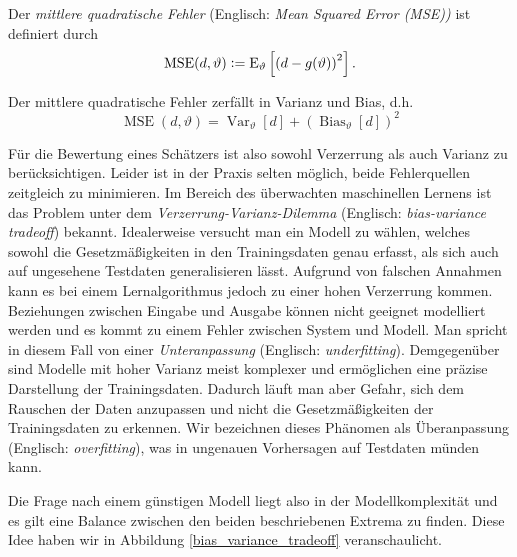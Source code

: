 \begin{defn}
Der \textit{mittlere quadratische Fehler} (Englisch: \textit{Mean Squared Error (MSE))} ist definiert durch
$$\operatorname {MSE} (d,\vartheta ) \vcentcolon= \operatorname{E} _{\vartheta}\left[\left(d-g(\vartheta )\right)^{2}\right].$$
\end{defn}

\begin{thm}
Der mittlere quadratische Fehler zerfällt in Varianz und Bias, d.h.
$$\operatorname{MSE} (d,\vartheta) = \operatorname{Var}_{\vartheta}[d]+\left(\operatorname{Bias}_{\vartheta}[d]\right)^{2}$$
\end{thm}

Für die Bewertung eines Schätzers ist also sowohl Verzerrung als auch Varianz zu berücksichtigen. Leider ist in der Praxis selten möglich, beide Fehlerquellen zeitgleich zu minimieren. Im Bereich des überwachten maschinellen Lernens ist das Problem unter dem \textit{Verzerrung-Varianz-Dilemma} (Englisch: \textit{bias-variance tradeoff}) bekannt. Idealerweise versucht man ein Modell zu wählen, welches sowohl die Gesetzmäßigkeiten in den Trainingsdaten genau erfasst, als sich auch auf ungesehene Testdaten generalisieren lässt.
Aufgrund von falschen Annahmen kann es bei einem Lernalgorithmus jedoch zu einer hohen Verzerrung kommen. Beziehungen zwischen Eingabe und Ausgabe können nicht geeignet modelliert werden und es kommt zu einem Fehler zwischen System und Modell. Man spricht in diesem Fall von einer \textit{Unteranpassung} (Englisch: \textit{underfitting}).
Demgegenüber sind Modelle mit hoher Varianz meist komplexer und ermöglichen eine präzise Darstellung der Trainingsdaten. Dadurch läuft man aber Gefahr, sich dem Rauschen der Daten anzupassen und nicht die Gesetzmäßigkeiten der Trainingsdaten zu erkennen. Wir bezeichnen dieses Phänomen als Überanpassung (Englisch: \textit{overfitting}), was in ungenauen Vorhersagen auf Testdaten münden kann. 

Die Frage nach einem günstigen Modell liegt also in der Modellkomplexität und es gilt eine Balance zwischen den beiden beschriebenen Extrema zu finden. Diese Idee haben wir in Abbildung \ref{bias_variance_tradeoff} veranschaulicht.

